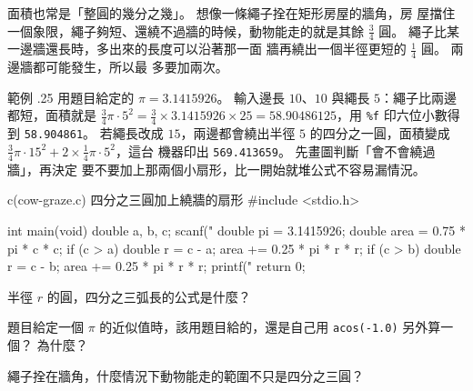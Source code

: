 面積也常是「整圓的幾分之幾」。 想像一條繩子拴在矩形房屋的牆角，房
屋擋住一個象限，繩子夠短、還繞不過牆的時候，動物能走的就是其餘
$\frac{3}{4}$ 圓。 繩子比某一邊牆還長時，多出來的長度可以沿著那一面
牆再繞出一個半徑更短的 $\frac{1}{4}$ 圓。 兩邊牆都可能發生，所以最
多要加兩次。

\begin{center}
\label{fig:ch07-rope-corner-arc}
\end{center}

範例 \thechapter.25 用題目給定的 $\pi = 3.1415926$。 輸入邊長
$10$、$10$ 與繩長 $5$：繩子比兩邊都短，面積就是
$\frac{3}{4}\pi\cdot 5^2 = \frac{3}{4}\times 3.1415926\times 25 =
58.90486125$，用 \texttt{\%f} 印六位小數得到 \texttt{58.904861}。
若繩長改成 $15$，兩邊都會繞出半徑 $5$ 的四分之一圓，面積變成
$\frac{3}{4}\pi\cdot 15^2 + 2\times\frac{1}{4}\pi\cdot 5^2$，這台
機器印出 \texttt{569.413659}。 先畫圖判斷「會不會繞過牆」，再決定
要不要加上那兩個小扇形，比一開始就堆公式不容易漏情況。

\begin{example}{c}{(cow-graze.c) 四分之三圓加上繞牆的扇形}
#include <stdio.h>

int main(void) {
    double a, b, c;
    scanf("%
    double pi = 3.1415926;
    double area = 0.75 * pi * c * c;
    if (c > a) {
        double r = c - a;
        area += 0.25 * pi * r * r;
    }
    if (c > b) {
        double r = c - b;
        area += 0.25 * pi * r * r;
    }
    printf("%
    return 0;
}
\end{example}



\begin{drills}[label=drills:float-arc-area]
\item 半徑 $r$ 的圓，四分之三弧長的公式是什麼？
\item 題目給定一個 $\pi$ 的近似值時，該用題目給的，還是自己用
\texttt{acos(-1.0)} 另外算一個？ 為什麼？
\item 繩子拴在牆角，什麼情況下動物能走的範圍不只是四分之三圓？
\end{drills}


